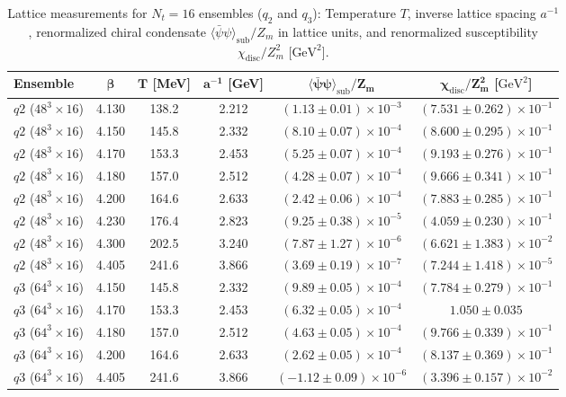 \documentclass[11pt,a4paper]{article}
\begin{document}
\begin{table}[htbp]
    \centering
    \caption{Lattice measurements for $N_t=16$ ensembles ($q_2$ and $q_3$): Temperature $T$, inverse lattice spacing $a^{-1}$, renormalized chiral condensate $\langle\bar{\psi}\psi\rangle_{\mathrm{sub}}/Z_m$ in lattice units, and renormalized susceptibility $\chi_{\mathrm{disc}} / Z_m^2$ [$\text{GeV}^2$].}
    \label{tab:raw_q2_q3}
    \small
    \begin{tabular}{lccccc}
        \toprule
        \textbf{Ensemble} & $\boldsymbol{\beta}$ & $\boldsymbol{T}$ [MeV] & $\boldsymbol{a^{-1}}$ [GeV] & $\boldsymbol{\langle\bar{\psi}\psi\rangle_{\mathrm{sub}}/Z_m}$ & $\boldsymbol{\chi_{\mathrm{disc}} / Z_m^2}$ [$\text{GeV}^2$] \\
        \midrule

        $q2$ ($48^3\times 16$) & 4.130 & 138.2 & 2.212 & $(1.13 \pm 0.01) \times 10^{-3}$ & $(7.531 \pm 0.262) \times 10^{-1}$ \\
        $q2$ ($48^3\times 16$) & 4.150 & 145.8 & 2.332 & $(8.10 \pm 0.07) \times 10^{-4}$ & $(8.600 \pm 0.295) \times 10^{-1}$ \\
        $q2$ ($48^3\times 16$) & 4.170 & 153.3 & 2.453 & $(5.25 \pm 0.07) \times 10^{-4}$ & $(9.193 \pm 0.276) \times 10^{-1}$ \\
        $q2$ ($48^3\times 16$) & 4.180 & 157.0 & 2.512 & $(4.28 \pm 0.07) \times 10^{-4}$ & $(9.666 \pm 0.341) \times 10^{-1}$ \\
        $q2$ ($48^3\times 16$) & 4.200 & 164.6 & 2.633 & $(2.42 \pm 0.06) \times 10^{-4}$ & $(7.883 \pm 0.285) \times 10^{-1}$ \\
        $q2$ ($48^3\times 16$) & 4.230 & 176.4 & 2.823 & $(9.25 \pm 0.38) \times 10^{-5}$ & $(4.059 \pm 0.230) \times 10^{-1}$ \\
        $q2$ ($48^3\times 16$) & 4.300 & 202.5 & 3.240 & $(7.87 \pm 1.27) \times 10^{-6}$ & $(6.621 \pm 1.383) \times 10^{-2}$ \\
        $q2$ ($48^3\times 16$) & 4.405 & 241.6 & 3.866 & $(3.69 \pm 0.19) \times 10^{-7}$ & $(7.244 \pm 1.418) \times 10^{-5}$ \\
        \midrule
        $q3$ ($64^3\times 16$) & 4.150 & 145.8 & 2.332 & $(9.89 \pm 0.05) \times 10^{-4}$ & $(7.784 \pm 0.279) \times 10^{-1}$ \\
        $q3$ ($64^3\times 16$) & 4.170 & 153.3 & 2.453 & $(6.32 \pm 0.05) \times 10^{-4}$ & $1.050 \pm 0.035$ \\
        $q3$ ($64^3\times 16$) & 4.180 & 157.0 & 2.512 & $(4.63 \pm 0.05) \times 10^{-4}$ & $(9.766 \pm 0.339) \times 10^{-1}$ \\
        $q3$ ($64^3\times 16$) & 4.200 & 164.6 & 2.633 & $(2.62 \pm 0.05) \times 10^{-4}$ & $(8.137 \pm 0.369) \times 10^{-1}$ \\
        $q3$ ($64^3\times 16$) & 4.405 & 241.6 & 3.866 & $(-1.12 \pm 0.09) \times 10^{-6}$ & $(3.396 \pm 0.157) \times 10^{-2}$ \\
        \bottomrule
    \end{tabular}
\end{table}
\end{document}
